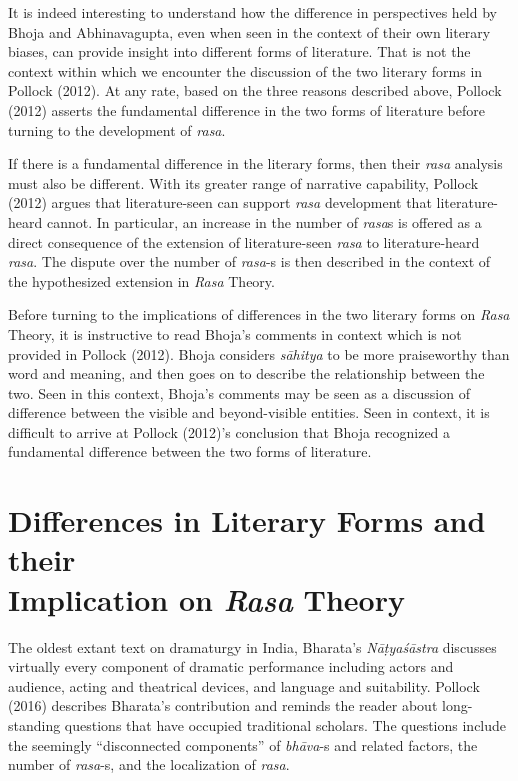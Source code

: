 It is indeed interesting to understand how the difference in perspectives held by Bhoja and Abhinavagupta, even when seen in the context of their own literary biases, can provide insight into different forms of literature. That is not the context within which we encounter the discussion of the two literary forms in Pollock (2012). At any rate, based on the three reasons described above, Pollock (2012) asserts the fundamental difference in the two forms of literature before turning to the development of \textsl{rasa}. 

If there is a fundamental difference in the literary forms, then their \textsl{rasa} analysis must also be different. With its greater range of narrative capability, Pollock (2012) argues that literature-seen can support \textsl{rasa} development that literature-heard cannot. In particular, an increase in the number of \textsl{rasa}s is offered as a direct consequence of the extension of literature-seen \textsl{rasa }to literature-heard \textsl{rasa}. The dispute over the number of \textsl{rasa}-s is then described in the context of the hypothesized extension in \textsl{Rasa} Theory.

Before turning to the implications of differences in the two literary forms on \textsl{Rasa} Theory, it is instructive to read Bhoja’s comments in context which is not provided in Pollock (2012). Bhoja considers \textsl{sāhitya} to be more praiseworthy than word and meaning, and then goes on to describe the relationship between the two. Seen in this context, Bhoja’s comments may be seen as a discussion of difference between the visible and beyond-visible entities. Seen in context, it is difficult to arrive at Pollock (2012)’s conclusion that Bhoja
 recognized a fundamental difference between the two forms of literature.

\section*{Differences in Literary Forms and their\\ Implication on \textsl{Rasa} Theory}

The oldest extant text on dramaturgy in India, Bharata’s \textsl{Nāṭyaśāstra} discusses virtually every component of dramatic performance including actors and audience, acting and theatrical devices, and language and suitability. Pollock (2016) describes Bharata’s contribution and reminds the reader about long-standing questions that have occupied traditional scholars. The questions include the seemingly “disconne\-cted components” of \textsl{bhāva}-s and related factors, the number of \textsl{rasa}-s, and the localization of \textsl{rasa}.

